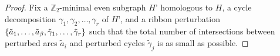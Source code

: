 \documentclass[letterpaper,review]{siamart190516}
\def\Z{\mathbb{Z}}
\let\eps\varepsilon
\def\jnote#1{\textcolor{orange}{Jeff: #1}}
\begin{document}
\begin{proof}
%
%
Fix a $\Z_2$-minimal even subgraph $H’$ homologous to $H$, a cycle decomposition $\gamma_1, \gamma_2, \dots, \gamma_r$ of $H’$, and a ribbon perturbation $\{ \tilde{a}_1,  \dots, \tilde{a}_\beta, \tilde\gamma_1, \dots, \tilde\gamma_r \}$ such that the total number of intersections between perturbed arcs $\tilde{a}_i$ and perturbed cycles $\tilde\gamma_j$ is as small as possible.


\end{proof}
\end{document}

